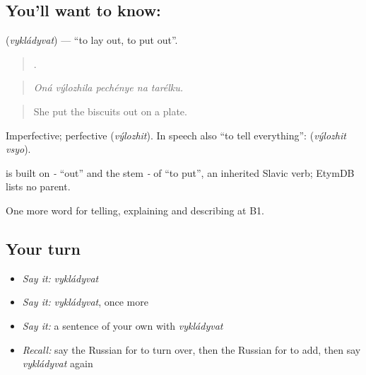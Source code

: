 \subsection*{You'll want to know: }
\textbf{} (\emph{vykládyvat}) — \textquotedblleft{}to lay out, to put out\textquotedblright{}.

\begin{quote}
    .
\end{quote}

\begin{quote}
\emph{Oná výlozhila pechénye na tarélku.}
\end{quote}

\begin{quote}
She put the biscuits out on a plate.
\end{quote}

Imperfective; perfective \emph{} (\emph{výlozhit}). In speech also \textquotedblleft{}to tell everything\textquotedblright{}: \emph{ } (\emph{výlozhit vsyo}).

\begin{cousinweb}
\emph{} is built on \emph{-} \textquotedblleft{}out\textquotedblright{} and the stem \emph{-} of \emph{} \textquotedblleft{}to put\textquotedblright{}, an inherited Slavic verb; EtymDB lists no parent.
\end{cousinweb}

\begin{grammarlens}[title={What you've built}]
One more word for telling, explaining and describing at B1.
\end{grammarlens}

\subsection*{Your turn}
\begin{itemize}
\raggedright
  \item \emph{Say it:} \emph{vykládyvat}
  \item \emph{Say it:} \emph{vykládyvat}, once more
  \item \emph{Say it:} a sentence of your own with \emph{vykládyvat}
  \item \emph{Recall:} say the Russian for to turn over, then the Russian for to add, then say \emph{vykládyvat} again
\end{itemize}

